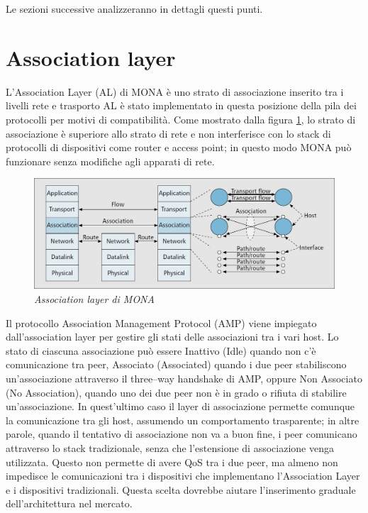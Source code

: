 \documentclass[12pt,a4paper,openright,twoside]{book}
\begin{document}
Le sezioni successive analizzeranno in dettagli questi punti.

\section{Association layer}

L'Association Layer (AL) di MONA è uno strato di associazione inserito
tra i livelli rete e trasporto AL è stato implementato in questa
posizione della pila dei protocolli per motivi di compatibilità. Come
mostrato dalla figura \ref{fig:mona-association-layer}, lo strato di
associazione è superiore allo strato di rete e non interferisce con lo
stack di protocolli di dispositivi come router e access point; in
questo modo MONA può funzionare senza modifiche agli apparati di rete.

\begin{figure}
\centering
\includegraphics[width=\textwidth]{img/mona-association-layer}
\caption{\em Association layer di MONA}
\label{fig:mona-association-layer}
\end{figure}

Il protocollo Association Management Protocol (AMP) viene impiegato
dall'association layer per gestire gli stati delle associazioni tra i
vari host. Lo stato di ciascuna associazione può essere Inattivo
(Idle) quando non c'è comunicazione tra peer, Associato (Associated)
quando i due peer stabiliscono un'associazione attraverso il
three--way handshake di AMP, oppure Non Associato (No Association),
quando uno dei due peer non è in grado o rifiuta di stabilire
un'associazione. In quest'ultimo caso il layer di associazione
permette comunque la comunicazione tra gli host, assumendo un
comportamento trasparente; in altre parole, quando il tentativo di
associazione non va a buon fine, i peer comunicano attraverso lo stack
tradizionale, senza che l'estensione di associazione venga
utilizzata. Questo non permette di avere QoS tra i due peer, ma almeno
non impedisce le comunicazioni tra i dispositivi che implementano
l'Association Layer e i dispositivi tradizionali. Questa scelta
dovrebbe aiutare l'inserimento graduale dell'architettura nel mercato.
\end{document}
